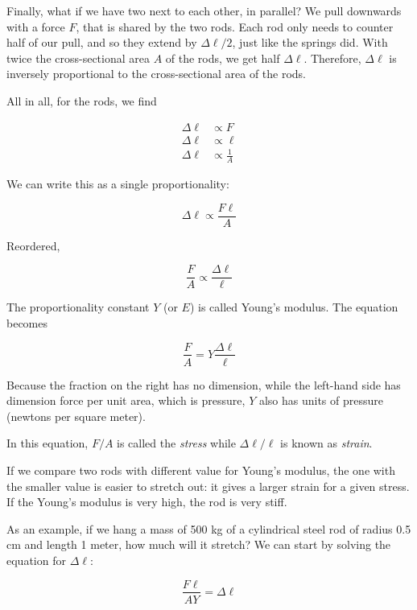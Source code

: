 Finally, what if we have two next to each other, in parallel? We pull downwards with a force $F$, that is shared by the two rods. Each rod only needs to counter half of our pull, and so they extend by $\Delta \ell/2$, just like the springs did. With twice the cross-sectional area $A$ of the rods, we get half $\Delta \ell$. Therefore, $\Delta \ell$ is inversely proportional to the cross-sectional area of the rods.

All in all, for the rods, we find

\begin{align}
\Delta \ell &\propto F\\
\Delta \ell &\propto \ell\\
\Delta \ell &\propto \frac{1}{A}
\end{align}

We can write this as a single proportionality:

\begin{equation}
\Delta \ell \propto \frac{F \ell}{A}
\end{equation}

Reordered,

\begin{equation}
\frac{F}{A} \propto \frac{\Delta \ell}{\ell}
\end{equation}

The proportionality constant $Y$ (or $E$) is called Young's modulus. The equation becomes

\begin{equation}
\frac{F}{A} = Y \frac{\Delta \ell}{\ell}
\end{equation}

Because the fraction on the right has no dimension, while the left-hand side has dimension force per unit area, which is pressure, $Y$ also has units of pressure (newtons per square meter).

In this equation, $F/A$ is called the \emph{stress} while $\Delta \ell/\ell$ is known as \emph{strain}.

If we compare two rods with different value for Young's modulus, the one with the smaller value is easier to stretch out: it gives a larger strain for a given stress. If the Young's modulus is very high, the rod is very stiff.

As an example, if we hang a mass of 500 kg of a cylindrical steel rod of radius 0.5 cm and length 1 meter, how much will it stretch? We can start by solving the equation for $\Delta \ell$:

\begin{equation}
\frac{F \ell}{A Y} = \Delta \ell
\end{equation}

